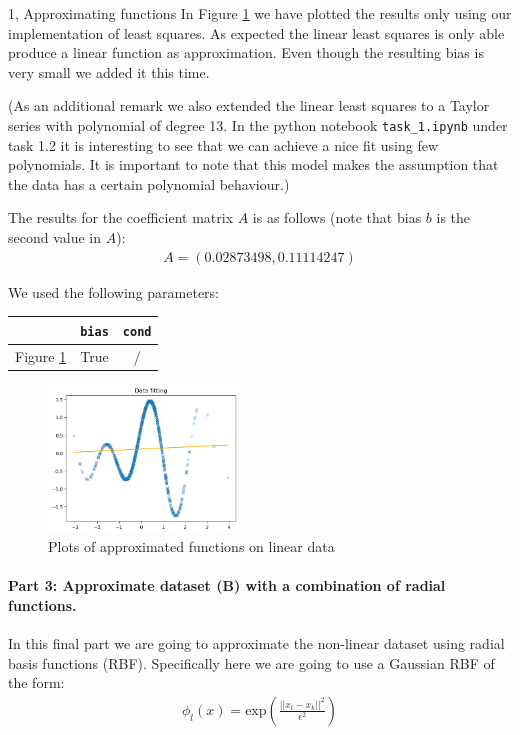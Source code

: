 \begin{task}{1, Approximating functions}
In Figure \ref{fig:t1_2} we have plotted the results only using our implementation of least squares. As expected the linear least squares is only able produce a linear function as approximation. Even though the resulting bias is very small we added it this time.

(As an additional remark we also extended the linear least squares to a Taylor series with polynomial of degree 13. In the python notebook \verb|task_1.ipynb| under task 1.2 it is interesting to see that we can achieve a nice fit using few polynomials. It is important to note that this model makes the assumption that the data has a certain polynomial behaviour.)

\begin{minipage}{\linewidth}%
The results for the coefficient matrix $A$ is as follows (note that bias $b$ is the second value in $A$):
\begin{align*}
    A = (0.02873498, 0.11114247)
\end{align*}

We used the following parameters:
\begin{center}
    \bgroup
    \def\arraystretch{1.5}
    \begin{tabular}{ |l|c|c| }
    \hline
    & \verb|bias|  & \verb|cond|\\
    \hline
    Figure \ref{fig:t1_2} & True & /\\
    \hline
    \end{tabular}
    \egroup
\end{center}
\end{minipage}

\begin{figure}[H]
\centering
\includegraphics[width=0.45\textwidth]{images/t1-2.png}
\caption{Plots of approximated functions on linear data}
\label{fig:t1_2}
\end{figure}

\paragraph{Part 3: Approximate dataset (B) with a combination of radial functions.}
In this final part we are going to approximate the non-linear dataset using radial basis functions (RBF). Specifically here we are going to use a Gaussian RBF of the form:
\begin{align}
    \phi_l(x)=\text{exp}\left(\frac{||x_l -x_k||^2}{\epsilon^2}\right)
\end{align}


\end{task}
